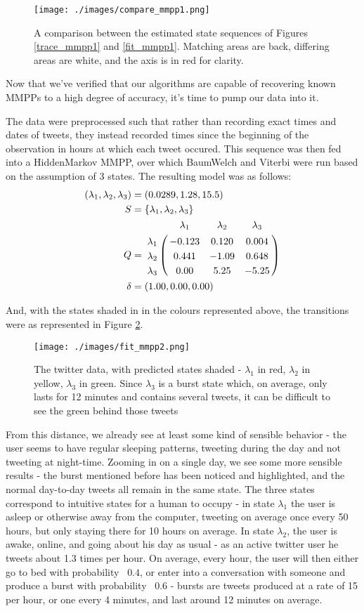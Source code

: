 \begin{figure}[h!]
\texttt{[image: ./images/compare\_mmpp1.png]}
\caption{A comparison between the estimated state sequences of Figures \ref{trace_mmpp1} and \ref{fit_mmpp1}. Matching areas are back, differing areas are white, and the axis is in red for clarity.}
\label{compare_mmpp1}
\end{figure}

Now that we've verified that our algorithms are capable of recovering known MMPPs to a high degree of accuracy, it's time to pump our data into it.

The data were preprocessed such that rather than recording exact times and dates of tweets, they instead recorded times since the beginning of the observation in hours at which each tweet occured. This sequence was then fed into a HiddenMarkov MMPP, over which BaumWelch and Viterbi were run based on the assumption of 3 states. The resulting model was as follows:
\begin{align*}
(\lambda_1,\lambda_2,\lambda_3) &= (0.0289,1.28,15.5)\\
S &= \{\lambda_1,\lambda_2,\lambda_3\}\\
Q &= \bordermatrix{      & \lambda_1 & \lambda_2 & \lambda_3\cr
                \lambda_1 & -0.123 & 0.120 & 0.004 \cr
                \lambda_2 & 0.441 & -1.09 & 0.648 \cr
                \lambda_3 & 0.00 & 5.25 & -5.25 \cr
			}\\
\delta &= (1.00,0.00,0.00)
\end{align*}

And, with the states shaded in in the colours represented above, the transitions were as represented in Figure \ref{fit_mmpp2}.

\begin{figure}[h!]
\texttt{[image: ./images/fit\_mmpp2.png]}
\caption{The twitter data, with predicted states shaded - $\lambda_1$ in red, $\lambda_2$ in yellow, $\lambda_3$ in green. Since $\lambda_3$ is a burst state which, on average, only lasts for 12 minutes and contains several tweets, it can be difficult to see the green behind those tweets}
\label{fit_mmpp2}
\end{figure}

From this distance, we already see at least some kind of sensible behavior - the user seems to have regular sleeping patterns, tweeting during the day and not tweeting at night-time. Zooming in on a single day, we see some more sensible results - the burst mentioned before has been noticed and highlighted, and the normal day-to-day tweets all remain in the same state. The three states correspond to intuitive states for a human to occupy - in state $\lambda_1$ the user is asleep or otherwise away from the computer, tweeting on average once every 50 hours, but only staying there for 10 hours on average. In state $\lambda_2$, the user is awake, online, and going about his day as usual - as an active twitter user he tweets about 1.3 times per hour. On average, every hour, the user will then either go to bed with probability ~$0.4$, or enter into a conversation with someone and produce a burst with probability ~$0.6$ - bursts are tweets produced at a rate of 15 per hour, or one every 4 minutes, and last around 12 minutes on average.

